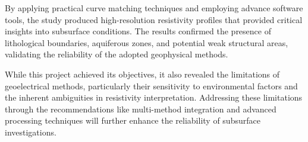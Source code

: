 \documentclass[12pt,a4paper]{report}
\begin{document}
By applying practical curve matching techniques and employing advance software tools, the study produced high-resolution resistivity profiles that provided critical insights into subsurface conditions. The results confirmed the presence of lithological boundaries, aquiferous zones, and potential weak structural areas, validating the reliability of the adopted geophysical methods.

While this project achieved its objectives, it also revealed the limitations of geoelectrical methods, particularly their sensitivity to environmental factors and the inherent ambiguities in resistivity interpretation. Addressing these limitations through the recommendations like multi-method integration and advanced processing techniques will further enhance the reliability of subsurface investigations.
\end{document}
